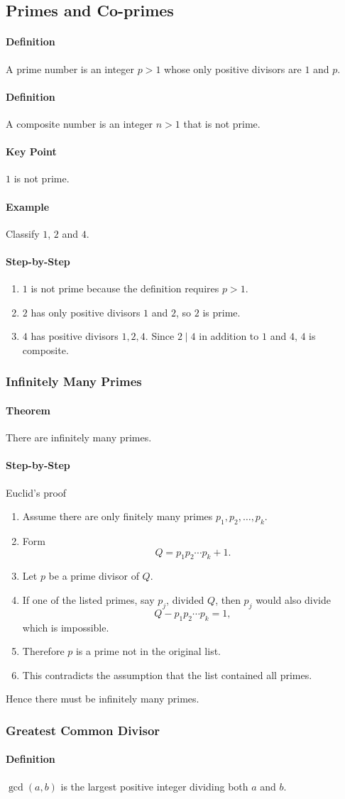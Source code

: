 \documentclass[12pt]{article}
\newcommand{\Definition}{\paragraph{Definition}}
\newcommand{\Step}{\paragraph{Step-by-Step}}
\newcommand{\Example}{\paragraph{Example}}
\newcommand{\KeyPoint}{\paragraph{Key Point}}
\newcommand{\Theorem}{\paragraph{Theorem}}
\begin{document}
\subsection{Primes and Co-primes}
\Definition A prime number is an integer $p>1$ whose only positive divisors are $1$ and $p$.

\Definition A composite number is an integer $n>1$ that is not prime.

\KeyPoint $1$ is not prime.

\Example Classify $1$, $2$ and $4$.

\Step
\begin{enumerate}
    \item $1$ is not prime because the definition requires $p>1$.
    \item $2$ has only positive divisors $1$ and $2$, so $2$ is prime.
    \item $4$ has positive divisors $1,2,4$. Since $2\mid4$ in addition to $1$ and $4$, $4$ is composite.
\end{enumerate}

\subsubsection{Infinitely Many Primes}
\Theorem There are infinitely many primes.

\Step{Euclid's proof}
\begin{enumerate}
    \item Assume there are only finitely many primes $p_1,p_2,\ldots,p_k$.
    \item Form
    \[
    Q=p_1p_2\cdots p_k+1.
    \]
    \item Let $p$ be a prime divisor of $Q$.
    \item If one of the listed primes, say $p_j$, divided $Q$, then $p_j$ would also divide
    \[
    Q-p_1p_2\cdots p_k=1,
    \]
    which is impossible.
    \item Therefore $p$ is a prime not in the original list.
    \item This contradicts the assumption that the list contained all primes.
\end{enumerate}
Hence there must be infinitely many primes.

\subsubsection{Greatest Common Divisor}
\Definition $\gcd(a,b)$ is the largest positive integer dividing both $a$ and $b$.
\end{document}
